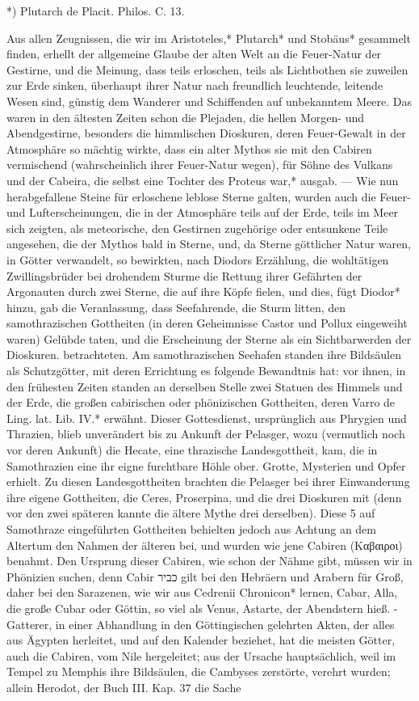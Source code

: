 \documentclass[a4paper, 11pt, oneside, polutonikogreek, german]{article}
\begin{document}
*) Plutarch de Placit. Philos. C. 13.

Aus allen Zeugnissen, die wir im Aristoteles,* Plutarch* und Stobäus* gesammelt finden, erhellt der allgemeine Glaube der alten Welt an die Feuer-Natur der Gestirne, und die Meinung, dass teils erloschen, teils als Lichtbothen sie zuweilen zur Erde sinken, überhaupt ihrer Natur nach freundlich leuchtende, leitende Wesen sind, günstig dem Wanderer und Schiffenden auf unbekanntem Meere. Das waren in den ältesten Zeiten schon die Plejaden, die hellen Morgen- und Abendgestirne, besonders die himmlischen Dioskuren, deren Feuer-Gewalt in der Atmosphäre so mächtig wirkte, dass ein alter Mythos sie mit den Cabiren vermischend (wahrscheinlich ihrer Feuer-Natur wegen), für Söhne des Vulkans und der Cabeira, die selbst eine Tochter des Proteus war,* ausgab. --- Wie nun herabgefallene Steine für erloschene leblose Sterne galten, wurden auch die Feuer- und Lufterscheinungen, die in der Atmosphäre teils auf der Erde, teils im Meer sich zeigten, als meteorische, den Gestirnen zugehörige oder entsunkene Teile angesehen, die der Mythos bald in Sterne, und, da Sterne göttlicher Natur waren, in Götter verwandelt, so bewirkten, nach Diodors Erzählung, die wohltätigen Zwillingsbrüder bei drohendem Sturme die Rettung ihrer Gefährten der Argonauten durch zwei Sterne, die auf ihre Köpfe fielen, und dies, fügt Diodor* hinzu, gab die Veranlassung, dass Seefahrende, die Sturm litten, den samothrazischen Gottheiten (in deren Geheimnisse Castor und Pollux eingeweiht waren) Gelübde taten, und die Erscheinung der Sterne als ein Sichtbarwerden der Dioskuren. betrachteten. Am samothrazischen Seehafen standen ihre Bildsäulen als Schutzgötter, mit deren Errichtung es folgende Bewandtnis hat: vor ihnen, in den frühesten Zeiten standen an derselben Stelle zwei Statuen des Himmels und der Erde, die großen cabirischen oder phönizischen Gottheiten, deren Varro de Ling. lat. Lib. IV.* erwähnt. Dieser Gottesdienst, ursprünglich aus Phrygien und Thrazien, blieb unverändert bis zu Ankunft der Pelasger, wozu (vermutlich noch vor deren Ankunft) die Hecate, eine thrazische Landesgottheit, kam, die in Samothrazien eine ihr eigne furchtbare Höhle ober. Grotte, Mysterien und Opfer erhielt. Zu diesen Landesgottheiten brachten die Pelasger bei ihrer Einwanderung ihre eigene Gottheiten, die Ceres, Proserpina, und die drei Dioskuren mit (denn vor den zwei späteren kannte die ältere Mythe drei derselben). Diese 5 auf Samothraze eingeführten Gottheiten behielten jedoch aus Achtung an dem Altertum den Nahmen der älteren bei, und wurden wie jene Cabiren (Καβαιροι) benahmt. Den Ursprung dieser Cabiren, wie schon der Nähme gibt, müssen wir in Phönizien suchen, denn Cabir כביר gilt bei den Hebräern und Arabern für Groß, daher bei den Sarazenen, wie wir aus Cedrenii Chronicon* lernen, Cabar, Alla, die große Cubar oder Göttin, so viel als Venus, Astarte, der Abendstern hieß. - Gatterer, in einer Abhandlung in den Göttingischen gelehrten Akten, der alles aus Ägypten herleitet, und auf den Kalender beziehet, hat die meisten Götter, auch die Cabiren, vom Nile hergeleitet; aus der Ursache hauptsächlich, weil im Tempel zu Memphis ihre Bildsäulen, die Cambyses zerstörte, verehrt wurden; allein Herodot, der Buch III. Kap. 37 die Sache 
\end{document}
